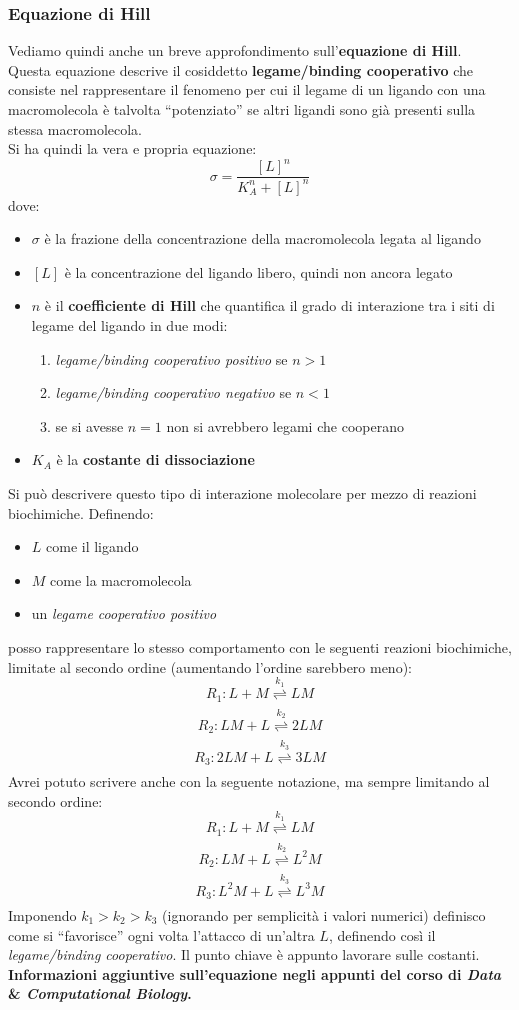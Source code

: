 \documentclass[a4paper,12pt, oneside]{book}
\begin{document}
\subsubsection{Equazione di Hill}
Vediamo quindi anche un breve approfondimento sull'\textbf{equazione di Hill}.\\
Questa equazione descrive il cosiddetto \textbf{legame/binding cooperativo} che
consiste 
nel rappresentare il fenomeno per cui il legame di un ligando con una
macromolecola è talvolta ``potenziato'' se altri ligandi sono già presenti sulla
stessa macromolecola.\\
Si ha quindi la vera e propria equazione:
\[\sigma=\frac{[L]^n}{K_A^n+[L]^n}\]
dove:
\begin{itemize}
  \item $\sigma$ è la frazione della concentrazione della macromolecola legata
  al ligando 
  \item $[L]$ è la concentrazione del ligando libero, quindi non ancora legato
  \item $n$ è il \textbf{coefficiente di Hill} che quantifica il grado di
  interazione tra i siti di legame del ligando in due modi:
  \begin{enumerate}
    \item \textit{legame/binding cooperativo positivo} se $n>1$
    \item \textit{legame/binding cooperativo negativo} se $n<1$
    \item se si avesse $n=1$ non si avrebbero legami che cooperano
  \end{enumerate}
  \item $K_A$ è la \textbf{costante di dissociazione}
\end{itemize}
Si può descrivere questo tipo di interazione molecolare per mezzo di reazioni
biochimiche. Definendo:
\begin{itemize}
  \item $L$ come il ligando
  \item $M$ come la macromolecola
  \item un \textit{legame cooperativo positivo}
\end{itemize}
posso rappresentare lo stesso comportamento con le seguenti reazioni
biochimiche, limitate al secondo ordine (aumentando l'ordine sarebbero meno):
\[R_1:L+M\underset{}{\stackrel{k_1}{\rightleftharpoons}} LM\]
\[R_2:LM+L\underset{}{\stackrel{k_2}{\rightleftharpoons}} 2LM\]
\[R_3:2LM+L\underset{}{\stackrel{k_3}{\rightleftharpoons}} 3LM\]
Avrei potuto scrivere anche con la seguente notazione, ma sempre limitando al
secondo ordine:
\[R_1:L+M\underset{}{\stackrel{k_1}{\rightleftharpoons}} LM\]
\[R_2:LM+L\underset{}{\stackrel{k_2}{\rightleftharpoons}} L^2M\]
\[R_3:L^2M+L\underset{}{\stackrel{k_3}{\rightleftharpoons}} L^3M\]
Imponendo $k_1> k_2>k_3$ (ignorando per semplicità i valori numerici) definisco
come si ``favorisce'' ogni 
volta l'attacco di un'altra $L$, definendo così il \textit{legame/binding
  cooperativo}. Il punto chiave è appunto lavorare sulle 
costanti.\\ 
\textbf{Informazioni aggiuntive sull'equazione negli appunti
  del corso di\textit{ Data} \& \textit{Computational Biology}.}
\end{document}

